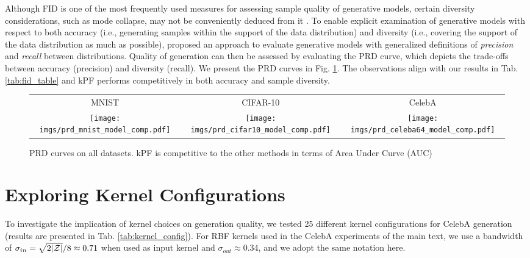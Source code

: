 Although FID is one of the most frequently used measures for assessing sample quality of generative models, certain diversity considerations, such as mode collapse, may not be conveniently deduced from it \citep{sajjadi2018prd}. To enable explicit examination of generative models with respect to both accuracy (i.e., generating samples within the support of the data distribution) and diversity (i.e., covering the support of the data distribution as much as possible), \citet{sajjadi2018prd} proposed an approach to evaluate generative models with generalized definitions of \textit{precision} and \textit{recall} between distributions. Quality of generation can then be assessed by evaluating the PRD curve, which depicts the trade-offs between accuracy (precision) and diversity (recall). We present the PRD curves in Fig. \ref{fig:prd}. The observations align with our results in Tab. \ref{tab:fid_table} and kPF performs competitively in both accuracy and sample diversity.

\begin{figure}[h]
    \centering
    \begin{tabular}{c c c}
        \quad MNIST & \quad CIFAR-10 & \quad CelebA\\
        \texttt{[image: imgs/prd\_mnist\_model\_comp.pdf]}&
        \texttt{[image: imgs/prd\_cifar10\_model\_comp.pdf]}&
        \texttt{[image: imgs/prd\_celeba64\_model\_comp.pdf]}\\
    \end{tabular}
    \caption{PRD curves on all datasets. kPF is competitive to the other methods in terms of Area Under Curve (AUC)}
    \label{fig:prd}
\end{figure}

\clearpage
\section{Exploring Kernel Configurations}

To investigate the implication of kernel choices on generation quality, we tested 25 different kernel configurations for CelebA generation (results are presented in Tab. \ref{tab:kernel_config}). For RBF kernels used in the CelebA experiments of the main text, we use a bandwidth of $\sigma_{in} = {\sqrt{2 |\mathcal{Z}|}} / {8} \approx 0.71$ when used as input kernel and $\sigma_{out} \approx 0.34$, and we adopt the same notation here.

